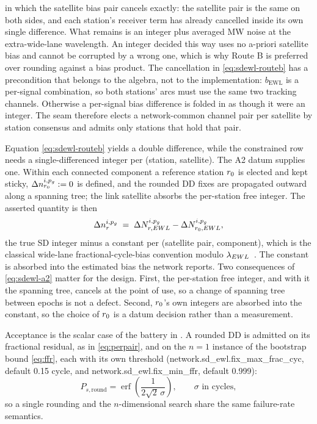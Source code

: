 \documentclass[main.tex]{subfiles}
\begin{document}
in which the satellite bias pair cancels exactly: the satellite pair is
the same on both sides, and each station's receiver term has already
cancelled inside its own single difference.  What remains is an integer
plus averaged MW noise at the extra-wide-lane wavelength.  An integer
decided this way uses no a-priori satellite bias and cannot be corrupted
by a wrong one, which is why Route B is preferred over rounding against
a bias product.  The cancellation in \eqref{eq:sdewl-routeb} has a
precondition that belongs to the algebra, not to the implementation:
$b_{\mathrm{EWL}}$ is a per-signal combination, so both stations' arcs
must use the same two tracking channels.  Otherwise a per-signal bias
difference is folded in as though it were an integer.  The seam
therefore elects a network-common channel pair per satellite by station
consensus and admits only stations that hold that pair.

Equation \eqref{eq:sdewl-routeb} yields a double difference, while the
constrained row needs a single-differenced integer per (station,
satellite).  The A2 datum supplies one.  Within each connected component
a reference station $r_0$ is elected and kept sticky, $\Delta n^{i,p_{g}}_{r_0} :=
0$ is defined, and the rounded DD fixes are propagated outward along a
spanning tree; the link satellite absorbs the per-station free integer.
The asserted quantity is then
\begin{equation}
\Delta n^{i,p_{g}}_{r}
\;=\;
\Delta N^{i,p_{g}}_{r,EWL}
- \Delta N^{i,p_{g}}_{r_0,EWL},
\label{eq:sdewl-a2}
\end{equation}
the true SD integer minus a constant per (satellite pair, component),
which is the classical wide-lane fractional-cycle-bias convention modulo
$\lambda_{EWL}$~\cite{laurichesse2009integer,geng2013triple}.  The constant is
absorbed into the estimated bias the network reports.  Two consequences
of \eqref{eq:sdewl-a2} matter for the design.  First, the per-station
free integer, and with it the spanning tree, cancels at the point of
use, so a change of spanning tree between epochs is not a defect.
Second, $r_0$'s own integers are absorbed into the constant, so the
choice of $r_0$ is a datum decision rather than a measurement.

Acceptance is the scalar case of the battery in .  A
rounded DD is admitted on its fractional residual, as in
\eqref{eq:perpair}, and on the $n = 1$ instance of the bootstrap bound
\eqref{eq:ffr}, each with its own threshold (network.sd\_ewl.fix\_max\_frac\_cyc,
default 0.15 cycle, and network.sd\_ewl.fix\_min\_ffr, default 0.999):
\begin{equation}
P_{s,\mathrm{round}}
= \operatorname{erf}\!\left(\frac{1}{2\sqrt{2}\,\sigma}\right),
\qquad \sigma \text{ in cycles},
\label{eq:sdewl-ffr}
\end{equation}
so a single rounding and the $n$-dimensional search share the same
failure-rate semantics.
\end{document}
